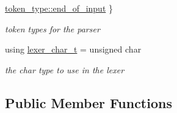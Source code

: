 \begin{DoxyCompactItemize}
\hyperlink{classnlohmann_1_1basic__json_1_1lexer_a96887d6cd131e3d3a85a9d71fbdbcdf7aca11f56dd477c09e06583dbdcda0985f}{token\+\_\+type\+::end\+\_\+of\+\_\+input}
 \}\begin{DoxyCompactList}\small\item\em token types for the parser \end{DoxyCompactList}
\item 
using \hyperlink{classnlohmann_1_1basic__json_1_1lexer_a7858ae971d07f21ad47fa8a0421001db}{lexer\+\_\+char\+\_\+t} = unsigned char
\begin{DoxyCompactList}\small\item\em the char type to use in the lexer \end{DoxyCompactList}\end{DoxyCompactItemize}
\subsection*{Public Member Functions}

